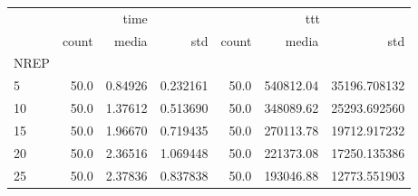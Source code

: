 \begin{tabular}{lrrrrrr}
\toprule
{} & \multicolumn{3}{c}{time} & \multicolumn{3}{c}{ttt} \\
{} & count &    media &       std & count &      media &           std \\
NREP &       &          &           &       &            &               \\
\midrule
5    &  50.0 &  0.84926 &  0.232161 &  50.0 &  540812.04 &  35196.708132 \\
10   &  50.0 &  1.37612 &  0.513690 &  50.0 &  348089.62 &  25293.692560 \\
15   &  50.0 &  1.96670 &  0.719435 &  50.0 &  270113.78 &  19712.917232 \\
20   &  50.0 &  2.36516 &  1.069448 &  50.0 &  221373.08 &  17250.135386 \\
25   &  50.0 &  2.37836 &  0.837838 &  50.0 &  193046.88 &  12773.551903 \\
\bottomrule
\end{tabular}

